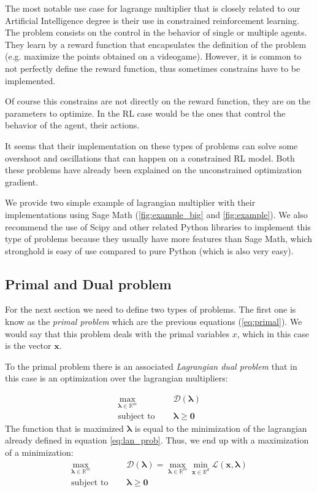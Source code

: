 \documentclass[]{article}
\theoremstyle{definition}
\begin{document}
The most notable use case for lagrange multiplier that is closely related to our Artificial Intelligence degree is their use in constrained reinforcement learning. The problem consists on the control in the behavior of single or multiple agents. They learn by a reward function that encapsulates the definition of the problem (e.g. maximize the points obtained on a videogame). However, it is common to not perfectly define the reward function, thus sometimes constrains have to be implemented.

Of course this constrains are not directly on the reward function, they are on the parameters to optimize. In the RL case would be the ones that control the behavior of the agent, their actions.

It seems that their implementation on these types of problems can solve some overshoot and oscillations that can happen on a constrained RL model. Both these problems have already been explained on the unconstrained optimization gradient.

We provide two simple example of lagrangian multiplier with their implementations using Sage Math (\ref{fig:example_big} and \ref{fig:example}). We also recommend the use of Scipy and other related Python libraries to implement this type of problems because they usually have more features than Sage Math, which stronghold is easy of use compared to pure Python (which is also very easy).

\subsection{Primal and Dual problem}

For the next section we need to define two types of problems. The first one is know as the \textit{primal problem} which are the previous equations (\ref{eq:primal}). We would say that this problem deals with the primal variables $x$, which in this case is the vector $\boldsymbol{x}$.

To the primal problem there is an associated \textit{Lagrangian dual problem} that in this case is an optimization over the lagrangian multipliers:

\begin{align}
	\max_{\boldsymbol{\lambda}\in\mathbb{R}^m} \quad  &\mathcal{D}(\boldsymbol{\lambda}) \\
	\text{subject to } \quad &\boldsymbol{\lambda} \geq \boldsymbol{0}
\end{align}
The function that is maximized $\mathcal{\boldsymbol{\lambda}}$ is equal to the minimization of the lagrangian already defined in equation \ref{eq:lan_prob}. Thus, we end up with a maximization of a minimization:
\begin{align}\label{eq:dual}
	\max_{\boldsymbol{\lambda}\in\mathbb{R}^m} \quad  &\mathcal{D}(\boldsymbol{\lambda}) = \max_{\boldsymbol{\lambda}\in\mathbb{R}^m} \min_{\boldsymbol{x}\in\mathbb{R}^d}\mathcal{L}(\boldsymbol{x}, \boldsymbol{\lambda}) \\
	\text{subject to } \quad &\boldsymbol{\lambda} \geq \boldsymbol{0}
\end{align}
\end{document}
